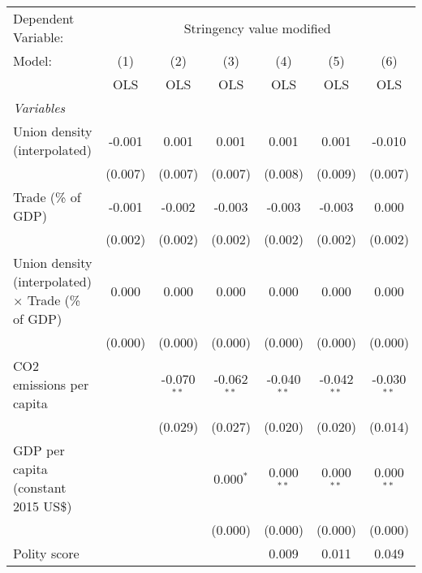 
\begingroup
\centering
\begin{tabular}{lcccccc}
   \toprule
   Dependent Variable: & \multicolumn{6}{c}{Stringency value modified}\\
   Model:                                                    & (1)     & (2)           & (3)           & (4)           & (5)           & (6)\\  
                                                             &  OLS    & OLS           & OLS           & OLS           & OLS           & OLS\\  
   \midrule
   \emph{Variables}\\
   Union density (interpolated)                              & -0.001  & 0.001         & 0.001         & 0.001         & 0.001         & -0.010\\   
                                                             & (0.007) & (0.007)       & (0.007)       & (0.008)       & (0.009)       & (0.007)\\   
   Trade (\% of GDP)                                         & -0.001  & -0.002        & -0.003        & -0.003        & -0.003        & 0.000\\   
                                                             & (0.002) & (0.002)       & (0.002)       & (0.002)       & (0.002)       & (0.002)\\   
   Union density (interpolated) $\times$ Trade (\% of GDP)   & 0.000   & 0.000         & 0.000         & 0.000         & 0.000         & 0.000\\   
                                                             & (0.000) & (0.000)       & (0.000)       & (0.000)       & (0.000)       & (0.000)\\   
   CO2 emissions per capita                                  &         & -0.070$^{**}$ & -0.062$^{**}$ & -0.040$^{**}$ & -0.042$^{**}$ & -0.030$^{**}$\\   
                                                             &         & (0.029)       & (0.027)       & (0.020)       & (0.020)       & (0.014)\\   
   GDP per capita (constant 2015 US\$)                       &         &               & 0.000$^{*}$   & 0.000$^{**}$  & 0.000$^{**}$  & 0.000$^{**}$\\   
                                                             &         &               & (0.000)       & (0.000)       & (0.000)       & (0.000)\\   
   Polity score                                              &         &               &               & 0.009         & 0.011         & 0.049\\   

\end{tabular}
